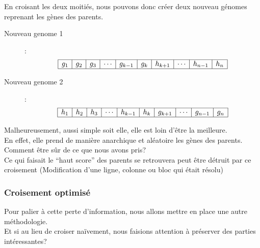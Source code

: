                    En croisant les deux moitiés, nous pouvons donc créer deux nouveau génomes reprenant les gènes des parents.
                    \begin{description}
                        \item[Nouveau genome 1]:\\
                            \[
                                \begin{array}{|c|c|c|c|c|c|c|c|c|c|}
                                    \hline
                                    g_1&g_2&g_3&\cdots&g_{k-1}&g_k&h_{k+1}&\cdots&h_{n-1}&h_{n}\\
                                    \hline
                                \end{array}
                            \]
                        \item[Nouveau genome 2]:\\
                            \[
                                \begin{array}{|c|c|c|c|c|c|c|c|c|c|}
                                    \hline
                                    h_1&h_2&h_3&\cdots&h_{k-1}&h_k&g_{k+1}&\cdots&g_{n-1}&g_{n}\\
                                    \hline
                                \end{array}
                            \]
                    \end{description}
                    Malheureusement, aussi simple soit elle, elle est loin d'être la meilleure.\\
                    En effet, elle prend de manière anarchique et aléatoire les gènes des parents. Comment être sûr de ce que nous avons pris?\\
                    Ce qui faisait le ``haut score'' des parents se retrouvera peut être détruit par ce croisement (Modification d'une ligne, colonne ou bloc qui était résolu)
            \subsubsection{Croisement optimisé}
                    Pour palier à cette perte d'information, nous allons mettre en place une autre méthodologie.\\
                    Et si au lieu de croiser naïvement, nous faisions attention à préserver des parties intéressantes?

